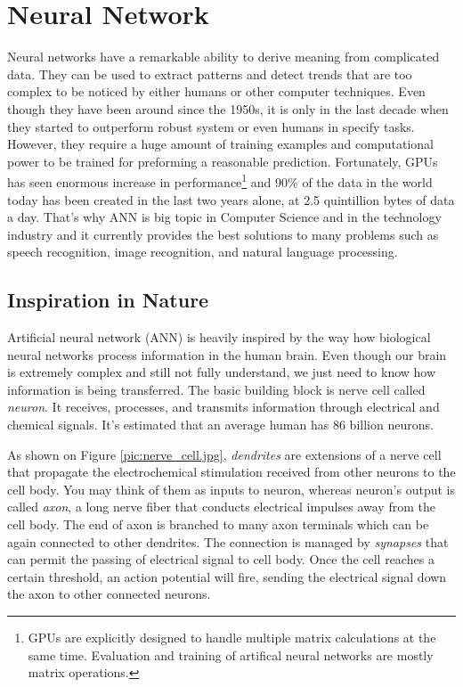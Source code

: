 \chapter{Neural Network}


Neural networks have a remarkable ability to derive meaning from complicated data. They can be used to extract patterns and detect trends that are too complex to be noticed by either humans or other computer techniques\cite{introduction_ann}.
Even though they have been around since the 1950s, it is only in the last decade when they started to outperform robust system or even humans in specify tasks.
However, they require a huge amount of training examples and computational power to be trained for preforming a reasonable prediction.
Fortunately, GPUs has seen enormous increase in performance\footnote{\label{note1}GPUs are explicitly designed to handle multiple matrix calculations at the same time. Evaluation and training of artifical neural networks are mostly matrix operations.} and
90\% of the data in the world today has been created in the last two years alone, at 2.5 quintillion bytes of data a day\cite{ibm_data}.
That's why ANN is big topic in Computer Science and in the technology industry and it currently provides the best solutions to many problems such as speech recognition, image recognition, and natural language processing.

\section{Inspiration in Nature}

Artificial neural network (ANN) is heavily inspired by the way how biological neural networks process information in the human brain.
Even though our brain is extremely complex and still not fully understand, we just need to know how information is being transferred.
The basic building block is nerve cell called \textit{neuron}. It receives, processes, and transmits information through electrical and chemical signals.
It's estimated that an average human has 86 billion neurons\cite{number_of_neurons}.


As shown on Figure \ref{pic:nerve_cell.jpg}, \textit{dendrites} are extensions of a nerve cell that propagate the electrochemical stimulation received from other neurons to the cell body.
You may think of them as inputs to neuron, whereas neuron's output is called \textit{axon}, a long nerve fiber that conducts electrical impulses away from the cell body.
The end of axon is branched to many axon terminals which can be again connected to other dendrites.
The connection is managed by \textit{synapses} that can permit the passing of electrical signal to cell body.
Once the cell reaches a certain threshold, an action potential will fire, sending the electrical signal down the axon to other connected neurons.

